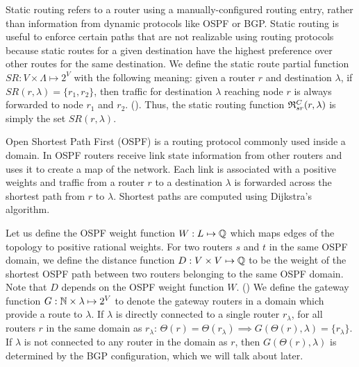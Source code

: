  Static routing refers to a router using a
manually-configured routing entry, rather than information from
dynamic protocols like OSPF or BGP.  Static routing is useful to enforce certain
paths that are not realizable using routing protocols because 
static
routes for a given destination have the highest preference over other routes for the same
destination.  
We define the static route partial
function $SR: V \times \Lambda \mapsto 2^V$ with the following meaning:  
given a router $r$
and destination $\lambda$, if $SR(r,\lambda)=\{r_1, r_2\}$, then traffic for
destination $\lambda$ reaching node $r$ is always forwarded to node
$r_1$ and $r_2$. (). 
Thus, the static routing function $\mathfrak{R}^C_{sr}(r, \lambda)$ is
simply the set $SR(r, \lambda)$. 


 Open Shortest Path First (OSPF) is a routing
protocol commonly used inside a domain. In OSPF routers receive link
state information from other routers and uses it to create a map of
the network. Each link is associated with a positive weights and traffic from a router $r$ to
a destination $\lambda$ is forwarded across the shortest path from $r$ to $\lambda$.
Shortest paths are computed using Dijkstra's algorithm.

Let us
define the OSPF weight function $W: L \mapsto \mathbb{Q}$ which 
maps edges of the topology to positive rational weights. 
For two routers $s$ and $t$ in the same OSPF domain, 
we define the distance function $D:V \times V \mapsto \mathbb{Q}$ 
to be the weight of the shortest OSPF path between two routers
belonging to the same OSPF domain. Note that $D$ depends on the 
OSPF weight function $W$. ()
We define the gateway function $G: \mathbb{N} \times \lambda \mapsto 2^V$ to denote the gateway routers in a domain which provide a route to $\lambda$. If $\lambda$ 
is directly connected to a single router $r_\lambda$, for all routers $r$ in the 
same domain as $r_\lambda$:  
$\Theta(r) = \Theta(r_\lambda) \implies G(\Theta(r), \lambda) = \{r_\lambda\}$.
 If $\lambda$ is not connected
to any router in the domain as $r$, then $G(\Theta(r),\lambda)$ is 
determined by the BGP configuration, which we will talk about later. 

